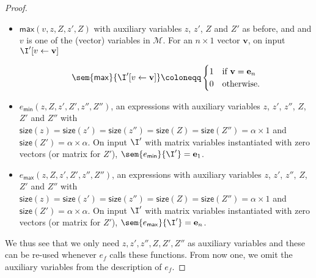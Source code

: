 \begin{proof}
\begin{itemize}
	\item $\textsf{max}(v,z,Z,z',Z)$ with auxiliary variables $z$, $z'$, $Z$ and $Z'$ as before, and 
	and $v$ is one of the (vector) variables in $\mathcal{M}$. For an $n\times 1$ vector $\mathbf{v}$, 
	on input $\I'[v\gets \mathbf{v}]$
	
	$$\sem{\mathsf{max}}{\I'[v\gets\mathbf{v}]}\coloneqq \begin{cases} 1 & \text{if $\mathbf{v}=\mathbf{e}_{n}$}\\
		0 & \text{otherwise}.
		\end{cases}$$
	\item $e_{\mathsf{min}}(z,Z,z',Z',z'',Z'')$, an expressions with
	auxiliary variables $z$, $z'$, $z''$, $Z$, $Z'$ and $Z''$ with 
	$\mathsf{size}(z)=\mathsf{size}(z')=\mathsf{size}(z'')=\mathsf{size}(Z)=\mathsf{size}(Z'')=\alpha\times 1$ 
	and $\mathsf{size}(Z')=\alpha\times\alpha$. On input $\I'$ with 
	matrix variables instantiated with zero vectors (or matrix for $Z'$),
 	 $\sem{e_{\mathsf{min}}}{\I'}=\mathbf{e}_1$. 
	\item $e_{\mathsf{max}}(z,Z,z',Z',z'',Z'')$, an expressions with
	auxiliary variables $z$, $z'$, $z''$, $Z$, $Z'$ and $Z''$ with 
	$\mathsf{size}(z)=\mathsf{size}(z')=\mathsf{size}(z'')=\mathsf{size}(Z)=\mathsf{size}(Z'')=\alpha\times 1$ 
	and $\mathsf{size}(Z')=\alpha\times\alpha$. On input $\I'$ with 
	matrix variables instantiated with zero vectors (or matrix for $Z'$),
 	 $\sem{e_{\mathsf{max}}}{\I'}=\mathbf{e}_n$. 	 		
\end{itemize}
We thus see that we only need $z,z',z'',Z,Z',Z''$ as auxiliary variables and these can be re-used 
whenever $e_f$ calls these functions. From now one, we omit the auxiliary variables from the description 
of $e_f$.



\end{proof}
